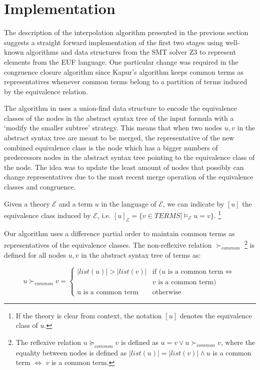 \section{Implementation}

The description of the interpolation algorithm presented in the
previous section suggests a straight forward implementation
of the first two stages using well-known algorithms 
\cite{10.1145/322186.322198,10.1145/322217.322228} 
and data structures from the SMT
solver Z3 \cite{10.1007/978-3-540-78800-3_24} to represent 
elements from the EUF language. One particular change was 
required in the congruence closure algorithm since Kapur's 
algorithm keeps common terms as representatives
whenever common terms belong to a partition of terms induced
by the equivalence relation.

The algorithm in \cite{10.1145/322217.322228}
uses a union-find data structure to encode the equivalence classes
of the nodes in the abstract syntax tree of the input formula with 
a `modify the smaller subtree' strategy. This means that
when two nodes $u, v$ in the abstract syntax tree are
meant to be merged, the representative of the new 
combined equivalence class is the node which has a bigger
numbers of predecessors nodes in the abstract
syntax tree pointing to the
equivalence class of the node. The idea was to update the least
amount of nodes that possibly can change representatives
due to the most recent merge operation of the equivalence classes 
and congruence.

\begin{notation}
  Given a theory $\mathcal{E}$ and a term $u$ in the language of 
  $\mathcal{E}$, we can indicate by $[u]$ the equivalence class
  induced by $\mathcal{E}$, i.e. $[u]_{\mathcal{E}} = \{ v \in TERMS | 
  \models_{\mathcal{E}} u = v\}$. \footnote{If the theory
    is clear from context, the notation $[u]$
  denotes the equivalence class of $u$.}
\end{notation}

Our algorithm uses a difference partial order to 
maintain common terms as representatives of 
the equivalence classes. The non-reflexive relation 
$\succ_{common}$ 
\footnote{The reflexive relation $u \succeq_{common} v$
  is defined as $u = v \lor u \succ_{common} v$, where
  the equality between nodes is defined as $|list(u)| = 
  |list(v)| \land u$ is a common term $\iff$ 
  $v$ is a common term.
}
is defined for all nodes $u, v$ in the abstract syntax 
tree of terms as:

\begin{equation*}
  u \succ_{common} v = \begin{cases} 
    |list(u)| > |list(v)| & \text{if }(u \text{ is a common term}\Leftrightarrow \\ 
    & v \text{ is a common term}) \\
    \text{u is a common term} & \text{otherwise}
  \end{cases}
\end{equation*}

